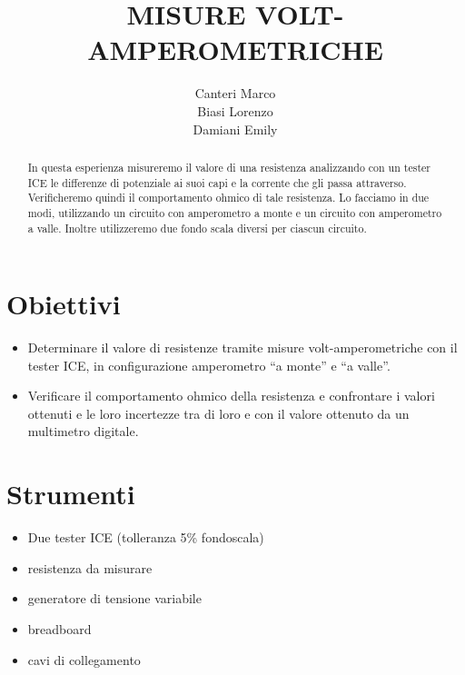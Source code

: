 \documentclass[12pt,titlepage]{article}
\title{\textbf{MISURE VOLT- AMPEROMETRICHE} }
\author{Canteri Marco\\Biasi Lorenzo\\Damiani Emily}
\date{}
\begin{document}
	\maketitle
	\tableofcontents
	\renewcommand{\abstractname}{Abstract}
	
	\begin{abstract}
In questa esperienza misureremo il valore di una resistenza analizzando con un tester ICE le differenze di potenziale ai suoi capi e la corrente che gli passa attraverso. Verificheremo quindi il comportamento ohmico di tale resistenza. Lo facciamo in due modi, utilizzando un circuito con amperometro a monte e un circuito con amperometro a valle. Inoltre utilizzeremo due fondo scala diversi per ciascun circuito. 
	\end{abstract}

\section{Obiettivi}
\begin{itemize}
\item Determinare il valore di resistenze tramite misure volt-amperometriche con il tester
ICE, in configurazione amperometro “a monte” e “a valle”.
\item Verificare il comportamento ohmico della resistenza e confrontare i valori ottenuti e
le loro incertezze tra di loro e con il valore ottenuto da un multimetro digitale.
\end{itemize}
\section{Strumenti}
\begin{itemize}
\item Due tester ICE (tolleranza 5\% fondoscala)
\item resistenza da misurare
\item generatore di tensione variabile
\item breadboard
\item cavi di collegamento
\end{itemize}
\end{document}
